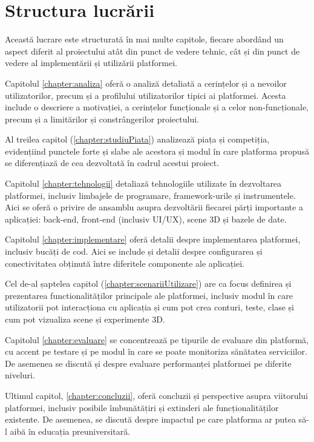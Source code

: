 \section{Structura lucrării}
\label{sec:proj}


Această lucrare este structurată în mai multe capitole, fiecare abordând un aspect diferit al proiectului atât din 
punct de vedere tehnic, cât și din punct de vedere al implementării și utilizării platformei.

Capitolul \ref{chapter:analiza} oferă o analiză detaliată a cerințelor și a nevoilor utilizatorilor, precum și a
profilului utilizatorilor tipici ai platformei. Acesta include o descriere a motivației, a cerințelor funcționale și
a celor non-funcționale, precum și a limitărilor și constrângerilor proiectului.

Al treilea capitol (\ref{chapter:studiuPiata}) analizează piața și competiția, evidențiind punctele forte și slabe ale acestora și modul în care platforma propusă se diferențiază
de cea dezvoltată în cadrul acestui proiect. 

Capitolul \ref{chapter:tehnologii} detaliază tehnologiile utilizate în dezvoltarea platformei, inclusiv limbajele de
programare, framework-urile și instrumentele. Aici se oferă o privire de ansamblu 
asupra dezvoltării fiecarei părți importante a aplicației: back-end, front-end (inclusiv UI/UX), scene 3D și bazele de date.

Capitolul \ref{chapter:implementare} oferă detalii despre implementarea platformei, inclusiv bucăți de cod.
Aici se include și detalii despre configurarea și conectivitatea obținută între diferitele componente 
ale aplicației.

Cel de-al șaptelea capitol (\ref{chapter:scenariiUtilizare}) are ca focus definirea și prezentarea functionalităților principale
ale platformei, inclusiv modul în care utilizatorii pot interacționa cu aplicația și cum pot crea conturi, teste, clase
și cum pot vizualiza scene și experimente 3D.

Capitolul \ref{chapter:evaluare} se concentrează pe tipurile de evaluare din platformă, cu accent pe testare și pe modul în
care se poate monitoriza sănătatea serviciilor. De asemenea se discută și despre
evaluare performanței platformei pe diferite niveluri.


Ultimul capitol, \ref{chapter:concluzii}, oferă concluzii și perspective asupra viitorului platformei, inclusiv
posibile îmbunătățiri și extinderi ale funcționalităților existente. De asemenea, se discută despre impactul pe care
platforma ar putea să-l aibă în educația preuniversitară.